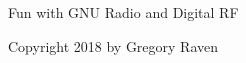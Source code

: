 \documentclass[oneside,letterpaper,12pt]{book}
\title{}
\author{}
\begin{document}
	


\frontmatter
Fun with GNU Radio and Digital RF

Copyright 2018 by Gregory Raven
\tableofcontents
\listoffigures
	

\mainmatter








\appendix

\backmatter
\end{document}
